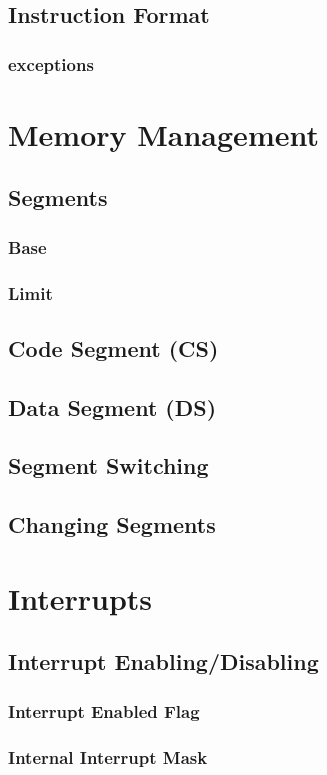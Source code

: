 \documentclass[oneside, a4paper]{memoir}
\begin{document}
\section{Instruction Format}
\subsection{exceptions}

\chapter{Memory Management}
\section{Segments}
\subsection{Base}
\subsection{Limit}
\section{Code Segment (CS)}
\section{Data Segment (DS)}
\section{Segment Switching}
\section{Changing Segments}

\chapter{Interrupts}
\section{Interrupt Enabling/Disabling}
\subsection{Interrupt Enabled Flag}
\subsection{Internal Interrupt Mask}
\end{document}
